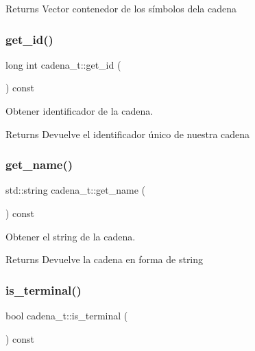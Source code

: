 \begin{DoxyReturn}{Returns}
Vector contenedor de los símbolos dela cadena 
\end{DoxyReturn}
\mbox{\label{classcadena__t_a89bcb7dc7f3d9d74f2b30c6bed40e3c7}} 
\subsubsection{\texorpdfstring{get\+\_\+id()}{get\_id()}}
{\footnotesize\ttfamily long int cadena\+\_\+t\+::get\+\_\+id (\begin{DoxyParamCaption}{ }\end{DoxyParamCaption}) const}



Obtener identificador de la cadena. 

\begin{DoxyReturn}{Returns}
Devuelve el identificador único de nuestra cadena 
\end{DoxyReturn}
\mbox{\label{classcadena__t_ae6de49c82b099053b5deb2152a011d5a}} 
\subsubsection{\texorpdfstring{get\+\_\+name()}{get\_name()}}
{\footnotesize\ttfamily std\+::string cadena\+\_\+t\+::get\+\_\+name (\begin{DoxyParamCaption}{ }\end{DoxyParamCaption}) const}



Obtener el string de la cadena. 

\begin{DoxyReturn}{Returns}
Devuelve la cadena en forma de string 
\end{DoxyReturn}
\mbox{\label{classcadena__t_a995b3ffd506dcd9423735e30608fb964}} 
\subsubsection{\texorpdfstring{is\+\_\+terminal()}{is\_terminal()}}
{\footnotesize\ttfamily bool cadena\+\_\+t\+::is\+\_\+terminal (\begin{DoxyParamCaption}{ }\end{DoxyParamCaption}) const}



